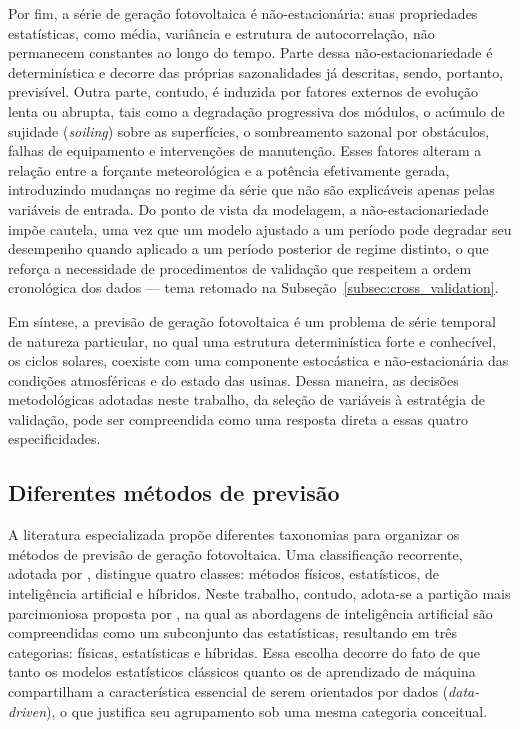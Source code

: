 Por fim, a série de geração fotovoltaica é não-estacionária: suas propriedades
estatísticas, como média, variância e estrutura de autocorrelação, não permanecem constantes
ao longo do tempo. Parte dessa não-estacionariedade é determinística e decorre das próprias
sazonalidades já descritas, sendo, portanto, previsível. Outra parte, contudo, é induzida
por fatores externos de evolução lenta ou abrupta, tais como a degradação progressiva dos
módulos, o acúmulo de sujidade (\emph{soiling}) sobre as superfícies, o sombreamento
sazonal por obstáculos, falhas de equipamento e intervenções de manutenção. Esses fatores
alteram a relação entre a forçante meteorológica e a potência efetivamente gerada,
introduzindo mudanças no regime da série que não são explicáveis apenas pelas variáveis de
entrada. Do ponto de vista da modelagem, a não-estacionariedade impõe cautela, uma vez que um modelo ajustado a um período pode degradar seu desempenho quando aplicado a um período posterior
de regime distinto, o que reforça a necessidade de procedimentos de validação que
respeitem a ordem cronológica dos dados — tema retomado na
Subseção~\ref{subsec:cross_validation}.

Em síntese, a previsão de geração fotovoltaica é um problema de série temporal de natureza
particular, no qual uma estrutura determinística forte e conhecível, os ciclos solares,
coexiste com uma componente estocástica e não-estacionária das condições atmosféricas e do
estado das usinas. Dessa maneira, as decisões metodológicas adotadas neste trabalho, da seleção
de variáveis à estratégia de validação, pode ser compreendida como uma resposta direta a
essas quatro especificidades.

\subsection{Diferentes métodos de previsão}
\label{subsec:metodos_previsao}



A literatura especializada propõe diferentes taxonomias para organizar os métodos
de previsão de geração fotovoltaica. Uma classificação recorrente, adotada por
, distingue quatro classes: métodos físicos, estatísticos, de
inteligência artificial e híbridos. Neste trabalho, contudo, adota-se a partição mais
parcimoniosa proposta por \cite{Markovics2022}, na qual as abordagens de
inteligência artificial são compreendidas como um subconjunto das estatísticas,
resultando em três categorias: físicas, estatísticas e híbridas.
Essa escolha decorre do fato de que tanto os modelos estatísticos clássicos quanto os
de aprendizado de máquina compartilham a característica essencial de serem orientados
por dados (\textit{data-driven}), o que justifica seu agrupamento sob uma mesma categoria
conceitual.

